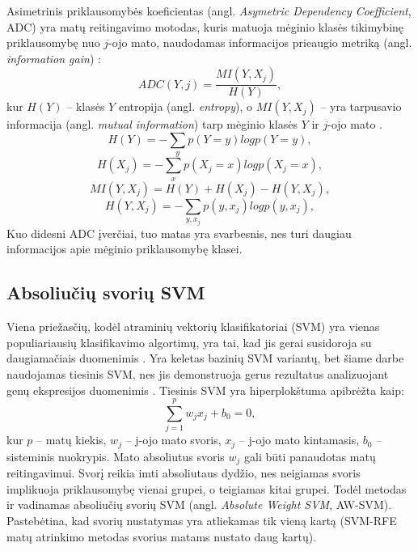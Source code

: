 Asimetrinis priklausomybės koeficientas (angl. \textit{Asymetric Dependency Coefficient}, ADC) yra matų reitingavimo motodas, kuris matuoja mėginio klasės tikimybinę priklausomybę nuo $j$-ojo mato, naudodamas informacijos prieaugio metriką (angl. \textit{information gain}) \cite{Shannon:2001:MTC:584091.584093}:
\begin{equation}
 ADC(Y, j) = \frac{MI(Y, X_j)}{H(Y)},
\end{equation}
kur $H(Y)$ -- klasės $Y$ entropija (angl. \textit{entropy}), o $MI(Y, X_j)$ -- yra tarpusavio informacija (angl. \textit{mutual information}) tarp mėginio klasės $Y$ ir $j$-ojo mato \cite{kent1983information}.
\begin{equation}
 H(Y)=-\sum_y{p(Y=y)log{p(Y=y)}}, 
\end{equation}
\begin{equation}
 H(X_j)=-\sum_x{p(X_j=x) log{p(X_j=x)}},
\end{equation}
\begin{equation}
 MI(Y, X_j) = H(Y) + H(X_j) - H(Y, X_j),
\end{equation}
\begin{equation}
 H(Y, X_j) = -\sum_{y,x_j}{p(y, x_j)log{p(y, x_j)}},
\end{equation}
Kuo didesni ADC įverčiai, tuo matas yra svarbesnis, nes turi daugiau informacijos apie mėginio priklausomybę klasei.

\subsection{Absoliučių svorių SVM}

Viena priežasčių, kodėl atraminių vektorių klasifikatoriai (SVM) yra vienas populiariausių klasifikavimo algortimų, yra tai, kad jis gerai susidoroja su daugiamačiais duomenimis \cite{guyon2002gene}. Yra keletas bazinių SVM variantų, bet šiame darbe naudojamas tiesinis SVM, nes jis demonstruoja gerus rezultatus analizuojant genų ekspresijos duomenimis \cite{vapnik2000nature}. Tiesinis SVM yra hiperplokštuma apibrėžta kaip:
\begin{equation}
 \sum_{j=1}^{p}{w_jx_j + b_0 = 0},
\end{equation}
kur $p$ -- matų kiekis, $w_j$ -- j-ojo mato svoris, $x_j$ -- j-ojo mato kintamasis, $b_0$ -- sisteminis nuokrypis. Mato absoliutus svoris $w_j$ gali būti panaudotas
matų reitingavimui. Svorį reikia imti absoliutaus dydžio, nes neigiamas svoris implikuoja priklausomybę vienai grupei, o teigiamas kitai grupei. Todėl metodas ir vadinamas absoliučių svorių SVM (angl. \textit{Absolute Weight SVM}, AW-SVM). Pastebėtina, kad svorių nustatymas yra atliekamas tik vieną kartą (SVM-RFE matų atrinkimo metodas svorius matams nustato daug kartų).

